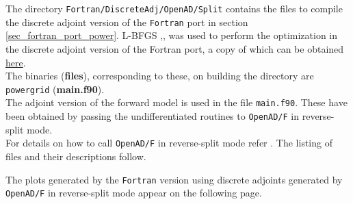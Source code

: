 \noindent The directory \texttt{Fortran/DiscreteAdj/OpenAD/Split} contains the files to compile the discrete adjoint version of the \texttt{Fortran} port in section \ref{sec_fortran_port_power}. L-BFGS \cite{Byrd_1996},\cite{Zhu_1997},\cite{Morales_2011} was used to perform the optimization in the discrete adjoint version of the Fortran port, a copy of which can be obtained \href{http://users.iems.northwestern.edu/~nocedal/lbfgsb.html}{here}.\\

\noindent The binaries (\textbf{files}), corresponding to these, on building the directory are \texttt{powergrid} (\textbf{{main.f90}}).\\

\noindent The adjoint version of the forward model is used in the file  \texttt{main.f90}. These have been obtained by passing the undifferentiated routines to \texttt{OpenAD/F} in reverse-split mode.\\

\noindent For details on how to call \texttt{OpenAD/F} in reverse-split mode refer \cite{Utke_2014}. The listing of files and their descriptions follow.\\


\hfill \break
\noindent The plots generated by the \texttt{Fortran} version using discrete adjoints generated by \texttt{OpenAD/F} in reverse-split mode appear on the following page.

